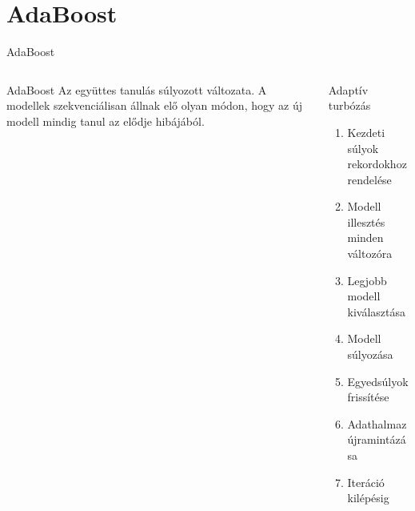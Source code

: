 \documentclass[english, aspectratio=169]{beamer}
\makeatletter
\let\origtableofcontents=\tableofcontents
\def\tableofcontents{\@ifnextchar[{\origtableofcontents}{\gobbletableofcontents}}
\def\gobbletableofcontents#1{\origtableofcontents}
\makeatother
\begin{document}
\section{AdaBoost}

\begin{frame}
\tableofcontents[currentsection]
\end{frame}

\begin{frame}{AdaBoost}
\begin{columns}
\begin{column}{.5\textwidth}
\begin{block}{AdaBoost}
Az együttes tanulás súlyozott változata. A modellek szekvenciálisan állnak elő olyan módon, hogy az új modell mindig tanul az elődje hibájából. 
\end{block}
\end{column}
\begin{column}{.5\textwidth}
\begin{algorithm}[H]
\caption{Adaptív turbózás}
\SetAlgoLined
\begin{enumerate}
	\item Kezdeti súlyok rekordokhoz rendelése
	\item Modell illesztés minden változóra
	\item Legjobb modell kiválasztása
	\item Modell súlyozása
	\item Egyedsúlyok frissítése
	\item Adathalmaz újramintázása
	\item Iteráció kilépésig
\end{enumerate}
\end{algorithm}
\end{column}
\end{columns}
\end{frame}
\end{document}
